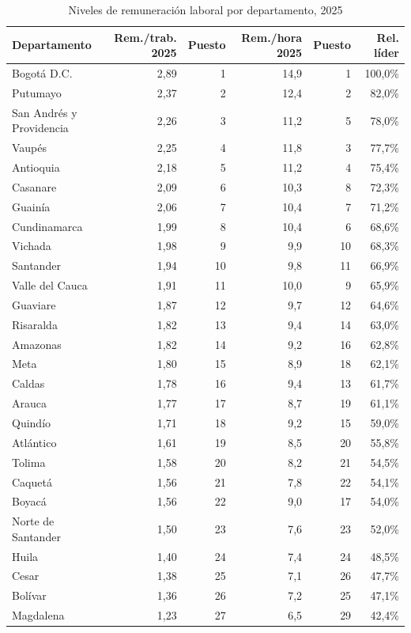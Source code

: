 \begin{table}[H]
\centering
\caption{Niveles de remuneración laboral por departamento, 2025}
\label{tab:dept_remuneracion_niveles_33}
\scriptsize
\begin{tabular}{lrrrrr}
\toprule
Departamento & Rem./trab. 2025 & Puesto & Rem./hora 2025 & Puesto & Rel. líder \\
\midrule
Bogotá D.C. & 2,89 & 1 & 14,9 & 1 & 100,0\% \\
Putumayo & 2,37 & 2 & 12,4 & 2 & 82,0\% \\
San Andrés y Providencia & 2,26 & 3 & 11,2 & 5 & 78,0\% \\
Vaupés & 2,25 & 4 & 11,8 & 3 & 77,7\% \\
Antioquia & 2,18 & 5 & 11,2 & 4 & 75,4\% \\
Casanare & 2,09 & 6 & 10,3 & 8 & 72,3\% \\
Guainía & 2,06 & 7 & 10,4 & 7 & 71,2\% \\
Cundinamarca & 1,99 & 8 & 10,4 & 6 & 68,6\% \\
Vichada & 1,98 & 9 & 9,9 & 10 & 68,3\% \\
Santander & 1,94 & 10 & 9,8 & 11 & 66,9\% \\
Valle del Cauca & 1,91 & 11 & 10,0 & 9 & 65,9\% \\
Guaviare & 1,87 & 12 & 9,7 & 12 & 64,6\% \\
Risaralda & 1,82 & 13 & 9,4 & 14 & 63,0\% \\
Amazonas & 1,82 & 14 & 9,2 & 16 & 62,8\% \\
Meta & 1,80 & 15 & 8,9 & 18 & 62,1\% \\
Caldas & 1,78 & 16 & 9,4 & 13 & 61,7\% \\
Arauca & 1,77 & 17 & 8,7 & 19 & 61,1\% \\
Quindío & 1,71 & 18 & 9,2 & 15 & 59,0\% \\
Atlántico & 1,61 & 19 & 8,5 & 20 & 55,8\% \\
Tolima & 1,58 & 20 & 8,2 & 21 & 54,5\% \\
Caquetá & 1,56 & 21 & 7,8 & 22 & 54,1\% \\
Boyacá & 1,56 & 22 & 9,0 & 17 & 54,0\% \\
Norte de Santander & 1,50 & 23 & 7,6 & 23 & 52,0\% \\
Huila & 1,40 & 24 & 7,4 & 24 & 48,5\% \\
Cesar & 1,38 & 25 & 7,1 & 26 & 47,7\% \\
Bolívar & 1,36 & 26 & 7,2 & 25 & 47,1\% \\
Magdalena & 1,23 & 27 & 6,5 & 29 & 42,4\% \\

\end{tabular}
\end{table}
